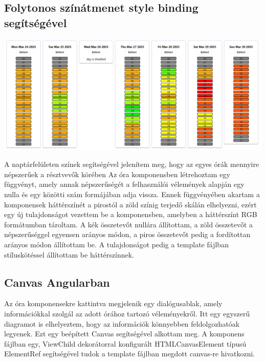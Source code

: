 \documentclass[a4paper,12pt]{report}
\theoremstyle{definition}
\theoremstyle{remark}
\begin{document}
	\subsection{Folytonos színátmenet style binding segítségével}

\begin{center}
\includegraphics[width=160mm]{week_view}
\captionsetup{width=0.8\linewidth}
\end{center}

A naptárfelületen színek segítségével jelenítem meg, hogy az egyes órák mennyire népszerűek a résztvevők körében Az óra komponensben létrehoztam egy függvényt, amely annak népszerűségét a felhasználói vélemények alapján egy nulla és egy közötti szám formájában adja vissza. Ennek függvényében akartam a komponensek háttérszínét a pirostól a zöld színig terjedő skálán elhelyezni, ezért egy új tulajdonságot vezettem be a komponensben, amelyben a háttérszínt RGB formátumban tároltam. A kék összetevőt nullára állítottam, a zöld összetevőt a népszerűséggel egyensen arányos módon, a piros összetevőt pedig a fordítottan arányos módon állítottam be. A tulajdonságot pedig a template fájlban stíluskötéssel állítottam be háttérszínnek.

	\subsection{Canvas Angularban}

Az óra komponensekre kattintva megjelenik egy dialógusablak, amely információkkal szolgál az adott órához tartozó véleményekről. Itt egy egyszerű diagramot is elhelyeztem, hogy az információk könnyebben feldolgozhatóak legyenek. Ezt egy beépített Canvas segítségével alkottam meg. A komponens fájlban egy, ViewChild dekorátorral konfigurált HTMLCanvasElement típusú ElementRef segítségével tudok a template fájlban megdott canvas-re hivatkozni.
\end{document}
